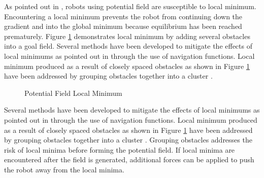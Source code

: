 \documentclass[numbered,pdftex]{ohio-etd}
\begin{document}
As pointed out in \cite{borenstein_real-time_1990}, robots using potential field are susceptible to local minimum. Encountering a local minimum prevents the robot from continuing down the gradient and into the global minimum because equilibrium has been reached prematurely. Figure \ref{fig:pfLocalMin} demonstrates local minimum by adding several obstacles into a goal field. Several methods have been developed to mitigate the effects of local minimums as pointed out in \cite{goerzen_survey_2010} through the use of navigation functions. Local minimum produced as a result of closely spaced obstacles as shown in Figure \ref{fig:pfLocalMin} have been addressed by grouping obstacles together into a cluster \cite{liu_virtual-waypoint_2016}.

\begin{figure}[h]
	\begin{subfigmatrix}{2}%
		\centering
	\end{subfigmatrix}
	\caption{Potential Field Local Minimum \cite{liu_virtual-waypoint_2016}}
	\label{fig:pfLocalMin}
\end{figure}

Several methods have been developed to mitigate the effects of local minimums as pointed out in \cite{goerzen_survey_2010} through the use of navigation functions. Local minimum produced as a result of closely spaced obstacles as shown in Figure \ref{fig:pfLocalMin} have been addressed by grouping obstacles together into a cluster \cite{liu_virtual-waypoint_2016}. Grouping obstacles addresses the risk of local minima before forming the potential field. If local minima are encountered after the field is generated, additional forces can be applied to push the robot away from the local minima. 
\end{document}
